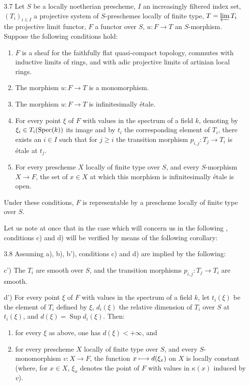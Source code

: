 \begin{proposition}{3.7}\label{XI.3.7}
Let $S$ be a locally noetherian prescheme, $I$ an increasingly filtered index set, $(T_i)_{i\in I}$ a projective system of $S$-preschemes locally of finite type, $T=\varprojlim T_i$ the projective limit functor, $F$ a functor over $S$, $u:F\to T$ an $S$-morphism. Suppose the following conditions hold:
\begin{enumerate}[label=\alph*)]
\item $F$ is a sheaf for the faithfully flat quasi-compact topology, commutes with inductive limits of rings, and with adic projective limits of artinian local rings.
\item The morphism $u:F\to T$ is a monomorphism.
\item[$\mathrm b'$)] The morphism $u:F\to T$ is infinitesimally étale.
\item For every point $\xi$ of $F$ with values in the spectrum of a field $k$, denoting by $\xi_i\in T_i(\operatorname{Spec}(k))$ its image and by $t_i$ the corresponding element of $T_i$, there exists an $i\in I$ such that for $j\ge i$ the transition morphism $p_{i,j}:T_j\to T_i$ is étale at $t_j$.
\item For every prescheme $X$ locally of finite type over $S$, and every $S$-morphism $X\to F$, the set of $x\in X$ at which this morphism is infinitesimally étale is open.
\end{enumerate}
Under these conditions, $F$ is representable by a prescheme locally of finite type over $S$.
\end{proposition}
Let us note at once that in the case which will concern us in the following \No, conditions c) and d) will be verified by means of the following corollary:
\begin{corollary}{3.8}\label{XI.3.8}
Assuming a), b), b'), conditions c) and d) are implied by the following:

c') The $T_i$ are smooth over $S$, and the transition morphisms $p_{i,j}:T_j\to T_i$ are smooth.

d') For every point $\xi$ of $F$ with values in the spectrum of a field $k$, let $t_i(\xi)$ be the element of $T_i$ defined by $\xi$, $d_i(\xi)$ the relative dimension of $T_i$ over $S$ at $t_i(\xi)$, and $d(\xi)=\operatorname{Sup}d_i(\xi)$. Then:
\begin{enumerate}[label=\arabic*$^\circ$)]
\item for every $\xi$ as above, one has $d(\xi)<+\infty$, and
\item for every prescheme $X$ locally of finite type over $S$, and every $S$-monomorphism $v:X\to F$, the function $x\longmapsto d(\xi_x)$ on $X$ is locally constant (where, for $x\in X$, $\xi_x$ denotes the point of $F$ with values in $\kappa(x)$ induced by $v$).
\end{enumerate}
\end{corollary}

